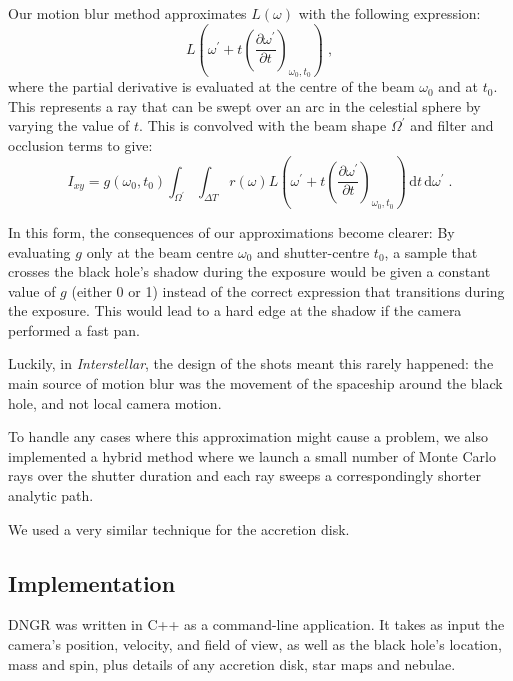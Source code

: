 \documentclass[12pt]{iopart}
\begin{document}
Our motion blur method approximates $L(\omega)$ with the following expression:
\begin{equation}
L\left(\omega^\prime + t\left(\frac{\partial \omega^\prime}{\partial t} \right)_{\!\omega_0, t_0} \right)\;,
\end{equation}
where the partial derivative is evaluated at the centre of the beam $\omega_0$ and at $t_0$.  This represents a ray that can be swept over an arc in the celestial sphere by varying the value of $t$. This is convolved with the beam shape $\Omega^\prime$ and filter and occlusion terms to give:
\begin{equation}
I_{xy} = g(\omega_0, t_0)\int_{\Omega^\prime} \!\int_{\Delta T} r(\omega) 
L\left(\omega^\prime + t\left(\frac{\partial \omega^\prime}{\partial t} \right)_{\!\omega_0, t_0} \right) \,\mathrm{d}t
\,\mathrm{d}\omega^\prime\;.
\end{equation}

In this form, the consequences of our approximations become clearer:
By evaluating $g$ only at the beam centre $\omega_0$ and shutter-centre $t_0$, a sample that crosses the black hole's shadow  during
the exposure would be given a constant value of $g$ (either 0 or 1) instead of the correct expression that transitions during the exposure. This would lead to a hard edge at the shadow if the camera performed a fast pan.

Luckily, in \emph{Interstellar}, the design of the shots meant this rarely happened: the main source of motion
blur was the movement of the spaceship around the black hole, and not local camera motion.

To handle any cases where this approximation might cause a problem, we also implemented a hybrid method where we
launch a small number of Monte Carlo rays over the shutter duration and each ray sweeps a
correspondingly shorter analytic path.

We used a very similar technique for the accretion disk.

\subsection{Implementation}
\label{subsec:App-Implementation}

DNGR was written in C++ as a command-line application. It takes as input the camera's position, velocity, and field of view, as well as the black hole's location, mass and spin, plus details of any accretion disk,  star maps and nebulae.
\end{document}

